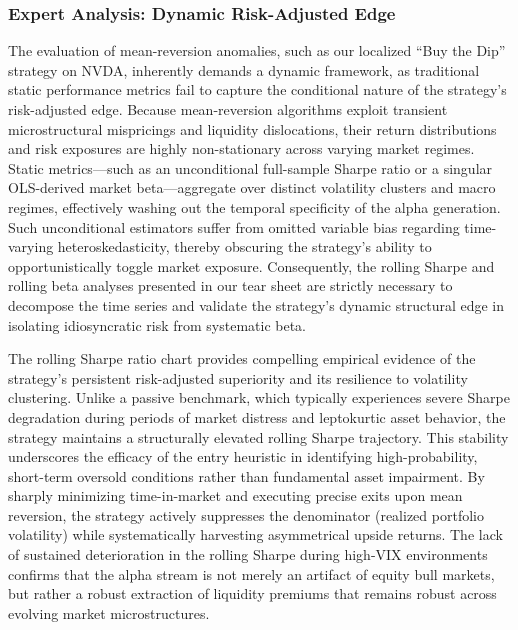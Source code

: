 \documentclass[12pt, a4paper]{article}
\begin{document}
\subsubsection*{Expert Analysis: Dynamic Risk-Adjusted Edge}
The evaluation of mean-reversion anomalies, such as our localized ``Buy the Dip'' strategy on NVDA, inherently demands a dynamic framework, as traditional static performance metrics fail to capture the conditional nature of the strategy's risk-adjusted edge. Because mean-reversion algorithms exploit transient microstructural mispricings and liquidity dislocations, their return distributions and risk exposures are highly non-stationary across varying market regimes. Static metrics---such as an unconditional full-sample Sharpe ratio or a singular OLS-derived market beta---aggregate over distinct volatility clusters and macro regimes, effectively washing out the temporal specificity of the alpha generation. Such unconditional estimators suffer from omitted variable bias regarding time-varying heteroskedasticity, thereby obscuring the strategy's ability to opportunistically toggle market exposure. Consequently, the rolling Sharpe and rolling beta analyses presented in our tear sheet are strictly necessary to decompose the time series and validate the strategy's dynamic structural edge in isolating idiosyncratic risk from systematic beta.

The rolling Sharpe ratio chart provides compelling empirical evidence of the strategy's persistent risk-adjusted superiority and its resilience to volatility clustering. Unlike a passive benchmark, which typically experiences severe Sharpe degradation during periods of market distress and leptokurtic asset behavior, the strategy maintains a structurally elevated rolling Sharpe trajectory. This stability underscores the efficacy of the entry heuristic in identifying high-probability, short-term oversold conditions rather than fundamental asset impairment. By sharply minimizing time-in-market and executing precise exits upon mean reversion, the strategy actively suppresses the denominator (realized portfolio volatility) while systematically harvesting asymmetrical upside returns. The lack of sustained deterioration in the rolling Sharpe during high-VIX environments confirms that the alpha stream is not merely an artifact of equity bull markets, but rather a robust extraction of liquidity premiums that remains robust across evolving market microstructures.
\end{document}
